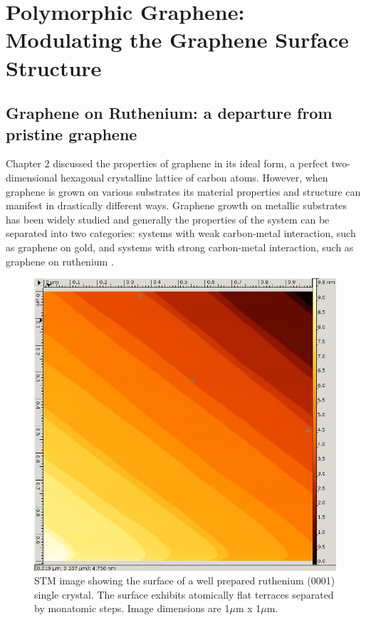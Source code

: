 \chapter{\sc Polymorphic Graphene: Modulating the Graphene Surface Structure}
\label{ch:Polymorphic Graphene}
\section{Graphene on Ruthenium: a departure from pristine graphene}

Chapter 2 discussed the properties of graphene in its ideal form, a perfect two-dimensional hexagonal crystalline lattice of carbon atoms. However, when graphene is grown on various substrates its material properties and structure can manifest in drastically different ways. Graphene growth on metallic substrates has been widely studied and generally the properties of the system can be separated into two categories: systems with weak carbon-metal interaction, such as graphene on gold, and systems with strong carbon-metal interaction, such as graphene on ruthenium \cite{batzill, graphene-metals}.

\begin{figure}

\centering

\includegraphics[scale=0.5]{./figs/ru-stm-clean.png}

\caption{
STM image showing the surface of a well prepared ruthenium (0001) single crystal. The surface exhibits atomically flat terraces separated by monatomic steps. Image dimensions are 1$\mu$m x 1$\mu$m.
}
\label{fig:ru-stm-clean}

\end{figure}

